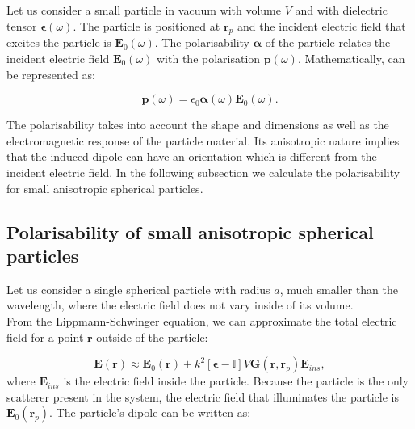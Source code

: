 Let us consider a small particle in vacuum with volume $V$ and with dielectric tensor $\boldsymbol{\epsilon}\left(\omega\right)$. The particle is positioned at $\mathbf{r}_p$ and the incident electric field that excites the particle is $\mathbf{E}_{0}\left(\omega\right)$. The polarisability $\boldsymbol{\alpha}$ of the particle relates the incident electric field $\mathbf{E}_{0}\left(\omega\right)$ with the polarisation $\mathbf{p}\left(\omega\right)$. Mathematically, can be represented as:

\begin{equation}
\mathbf{p}\left(\omega\right) = \epsilon_{0}\boldsymbol{\alpha}\left(\omega\right) \mathbf{E}_{0}\left(\omega\right).
\end{equation}

The polarisability takes into account the shape and dimensions as well as the electromagnetic response of the particle material. Its anisotropic nature implies that the induced dipole can have an orientation which is different from the incident electric field.
In the following subsection we calculate the polarisability for small anisotropic spherical particles.

\subsection{Polarisability of small anisotropic spherical particles\label{chap2:pol_of_small_particles}}

Let us consider a single spherical particle with radius $a$, much smaller than the wavelength, where the electric field does not vary inside of its volume. \\
From the Lippmann-Schwinger equation, we can approximate the total electric field for a point $\mathbf{r}$ outside of the particle:

\begin{equation}
\mathbf{E}\left(\mathbf{r}\right) \approx \mathbf{E}_{0}\left(\mathbf{r}\right) + k^{2}\left[\boldsymbol{\epsilon}-\mathbb{I}\right]V\mathbf{G}\left(\mathbf{r},\mathbf{r}_{p}\right)\mathbf{E}_{ins}\label{eq:chap2:E_tot_comp},
\end{equation}
where $\mathbf{E}_{ins}$ is the electric field inside the particle. Because the particle is the only scatterer present in the system, the electric field that illuminates the particle is $\mathbf{E}_{0}\left(\mathbf{r}_{p}\right)$. The particle's dipole can be written as:

